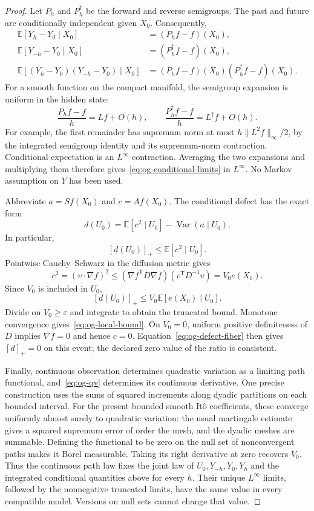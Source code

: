 \begin{proof}
Let $P_h$ and $P_h^\dagger$ be the forward and reverse semigroups. The past
and future are conditionally independent given $X_0$. Consequently,
\begin{align*}
 \mathbb E[Y_h-Y_0\mid X_0]&=(P_hf-f)(X_0),\\
 \mathbb E[Y_{-h}-Y_0\mid X_0]&=(P_h^\dagger f-f)(X_0),\\
 \mathbb E[(Y_h-Y_0)(Y_{-h}-Y_0)\mid X_0]
 &=(P_hf-f)(X_0)(P_h^\dagger f-f)(X_0).
\end{align*}
For a smooth function on the compact manifold, the semigroup expansion is
uniform in the hidden state:
\[
 \frac{P_hf-f}{h}=Lf+O(h),\qquad
 \frac{P_h^\dagger f-f}{h}=L^\dagger f+O(h).
\]
For example, the first remainder has supremum norm at most
$h\|L^2f\|_\infty/2$, by the integrated semigroup identity and its
supremum-norm contraction. Conditional expectation is an
$L^\infty$ contraction. Averaging the two expansions and multiplying them
therefore gives~\eqref{eq:og-conditional-limits} in $L^\infty$.
No Markov assumption on $Y$ has been used.

Abbreviate $a=Sf(X_0)$ and $c=Af(X_0)$. The conditional defect has the exact
form
\begin{equation}
 d(U_0)=\mathbb E[c^2\mid U_0]
             -\operatorname{Var}(a\mid U_0).
 \label{eq:og-defect-fiber}
\end{equation}
In particular,
\[
 [d(U_0)]_+\leq\mathbb E[c^2\mid U_0].
\]
Pointwise Cauchy--Schwarz in the diffusion metric gives
\[
 c^2=(v\mathbin{\cdot}\nabla f)^2
       \leq (\nabla f^{\mathsf T}D\nabla f)
             (v^{\mathsf T}D^{-1}v)=V_0 e(X_0).
\]
Since $V_0$ is included in $U_0$,
\[
 [d(U_0)]_+\leq V_0\mathbb E[e(X_0)\mid U_0].
\]
Divide on $V_0\geq\varepsilon$ and integrate to obtain the truncated
bound. Monotone convergence gives~\eqref{eq:og-local-bound}. On $V_0=0$,
uniform positive definiteness of $D$ implies $\nabla f=0$ and hence $c=0$.
Equation~\eqref{eq:og-defect-fiber} then gives $[d]_+=0$ on this event;
the declared zero value of the ratio is consistent.

Finally, continuous observation determines quadratic variation as a limiting
path functional, and~\eqref{eq:og-qv} determines its continuous derivative.
One precise construction uses the sums of squared increments along dyadic
partitions on each bounded interval. For the present bounded smooth It\^o
coefficients, these converge uniformly almost surely to quadratic variation:
the usual martingale estimate gives a squared supremum error of order the
mesh, and the dyadic meshes are summable. Defining the functional to be zero
on the null set of nonconvergent paths makes it Borel measurable. Taking its
right derivative at zero recovers $V_0$. Thus the continuous path law fixes
the joint law of $U_0,Y_{-h},Y_0,Y_h$ and the integrated conditional quantities
above for every $h$. Their unique $L^\infty$ limits, followed by the
nonnegative truncated limits, have the same value in every compatible model.
Versions on null sets cannot change that value.
\end{proof}

